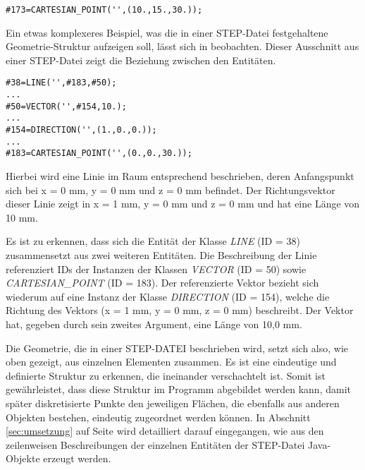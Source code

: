 \begin{lstlisting}[captionpos=b, style=customc, caption=Beschreibung eines Punktes in STEP, label=lis:simplestp]
#173=CARTESIAN_POINT('',(10.,15.,30.));
\end{lstlisting}

Ein etwas komplexeres Beispiel, was die in einer STEP-Datei festgehaltene Geometrie-Struktur aufzeigen soll, lässt sich in  beobachten. Dieser Ausschnitt aus einer STEP-Datei zeigt die Beziehung zwischen den Entitäten. 

\begin{lstfloat}
\begin{lstlisting}[captionpos=b, style=customc, caption=Beschreibung einer Linie in STEP, label=lis:exmpllinestp]
#38=LINE('',#183,#50);
...
#50=VECTOR('',#154,10.);
...
#154=DIRECTION('',(1.,0.,0.));
...
#183=CARTESIAN_POINT('',(0.,0.,30.));
\end{lstlisting} 
\end{lstfloat}

Hierbei wird eine Linie im Raum entsprechend beschrieben, deren Anfangspunkt sich bei x = 0 mm, y = 0 mm und z = 0 mm befindet. Der Richtungsvektor dieser Linie zeigt in x = 1 mm, y = 0 mm und z = 0 mm und hat eine Länge von 10 mm.

Es ist zu erkennen, dass sich die Entität der Klasse \textit{LINE} (ID = 38) zusammensetzt aus zwei weiteren Entitäten. Die Beschreibung der Linie referenziert IDs der Instanzen der Klassen \textit{VECTOR} (ID = 50) sowie \textit{CARTESIAN\_POINT} (ID = 183). Der referenzierte Vektor bezieht sich wiederum auf eine Instanz der Klasse \textit{DIRECTION} (ID = 154), welche die Richtung des Vektors (x = 1 mm, y = 0 mm, z = 0 mm) beschreibt. Der Vektor hat, gegeben durch sein zweites Argument, eine Länge von 10,0 mm.

Die Geometrie, die in einer STEP-DATEI beschrieben wird, setzt sich also, wie oben gezeigt, aus einzelnen Elementen zusammen. Es ist eine eindeutige und definierte Struktur zu erkennen, die ineinander verschachtelt ist. Somit ist gewährleistet, dass diese Struktur im Programm abgebildet werden kann, damit später diskretisierte Punkte den jeweiligen Flächen, die ebenfalls aus anderen Objekten bestehen, eindeutig zugeordnet werden können. 
In Abschnitt \ref{sec:umsetzung} auf Seite \pageref{sec:string2entity} wird detailliert darauf eingegangen, wie aus den zeilenweisen Beschreibungen der einzelnen Entitäten der STEP-Datei Java-Objekte erzeugt werden.              

